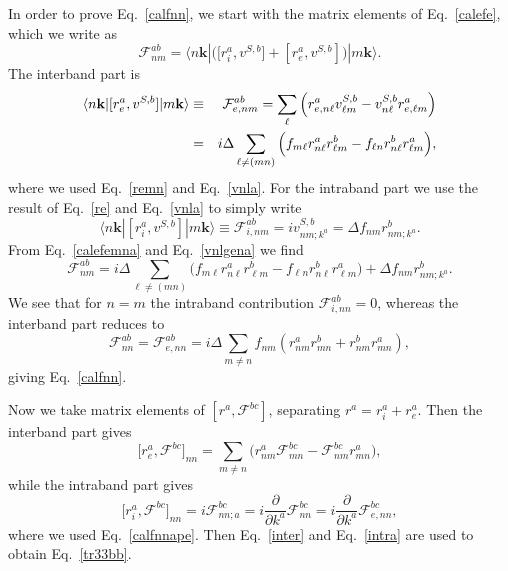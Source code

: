 \documentclass[floatfix,prb,aps,superscriptaddress,11pt]{revtex4}
\begin{document}
In order to prove Eq.~\eqref{calfnn}, we start with the matrix elements of
Eq.~\eqref{calefe}, which we write as 
\begin{equation*}
\mathcal{F}_{nm}^{ab}=\langle n\mathbf{k}|\big(\lbrack 
r_{i}^{a},v^{S,b}]+[r_{e}^{a},v^{S,b}]\big)|m\mathbf{k}\rangle.  
\end{equation*} 
The interband part is 
\begin{eqnarray}
\langle n\mathbf{k}| [r_e^a,v^{S,b}]|m\mathbf{k}\rangle &\equiv &\mathcal{F}
_{e,nm}^{ab}=\sum_{\ell }\Big(r_{e,n\ell }^{a}v_{\ell m}^{S,b}-v_{n\ell
}^{S,b}r_{e,\ell m}^{a}\Big)  \notag  \label{calefemna} \\
&=&
i\Delta\sum_{\ell\neq(mn)}\Big(f_{m\ell }r_{n\ell }^{a}r_{\ell
m}^{b}-f_{\ell n}r_{n\ell }^{b}r_{\ell m}^{a}\Big),
\end{eqnarray}
where we used Eq.~\eqref{remn} and Eq.~\eqref{vnla}. For the intraband
part we use the result of
Eq.~\eqref{re} and Eq.~\eqref{vnla}  to simply write 
\begin{equation}
\langle n\mathbf{k}| [r_i^a,v^{S,b}]|m\mathbf{k}\rangle\equiv \mathcal{F}
_{i,nm}^{ab}=iv_{nm;k^{a}}^{S,b}=\Delta f_{nm}r_{nm;k^{a}}^{b}.  \label{vnlgena}
\end{equation}
From Eq.~\eqref{calefemna} and Eq.~\eqref{vnlgena} we find 
\begin{equation}
\mathcal{F}_{nm}^{ab}=
i\Delta\sum_{\ell\neq(mn)}\Big(f_{m\ell }r_{n\ell }^{a}r_{\ell
m}^{b}-f_{\ell n}r_{n\ell }^{b}r_{\ell m}^{a}\Big)
+
\Delta f_{nm}r_{nm;k^{a}}^{b}.  \label{calfnmab}
\end{equation}
We see that for $n=m$ the intraband contribution $\mathcal{F}%
_{i,nn}^{ab}=0$, whereas the interband part reduces to 
\begin{equation}
\mathcal{F}_{nn}^{ab}=\mathcal{F}_{e,nn}^{ab}=i\Delta\sum_{m \neq n}f_{nm
}(r_{nm }^{a}r_{m n}^{b}+r_{nm }^{b}r_{m n}^{a}),
\label{calfnnape}
\end{equation}
giving Eq.~\eqref{calfnn}.

Now we take matrix elements of $[r^{a},\mathcal{F}^{bc}]$, separating $%
r^{a}=r_{i}^{a}+r_{e}^{a}$. Then the interband part gives 
\begin{equation}\label{inter}
\lbrack r_{e}^{a},\mathcal{F}^{bc}]_{nn}=\sum_{m\neq n}\big(r_{nm}^{a}
\mathcal{F}_{mn}^{bc}-\mathcal{F}_{nm}^{bc}r_{mn}^{a}\big),
\end{equation}
while the intraband part gives 
\begin{equation}\label{intra}
\lbrack r_{i}^{a},\mathcal{F}^{bc}]_{nn}=i\mathcal{F}_{nn;a}^{bc}=i\frac{
\partial }{\partial k^{a}}\mathcal{F}_{nn}^{bc}=i\frac{\partial }{\partial
k^{a}}\mathcal{F}_{e,nn}^{bc},
\end{equation}
where we used Eq.~\eqref{calfnnape}. Then Eq.~\eqref{inter} and 
Eq.~\eqref{intra} are used to obtain Eq.~\eqref{tr33bb}. 
\end{document}
